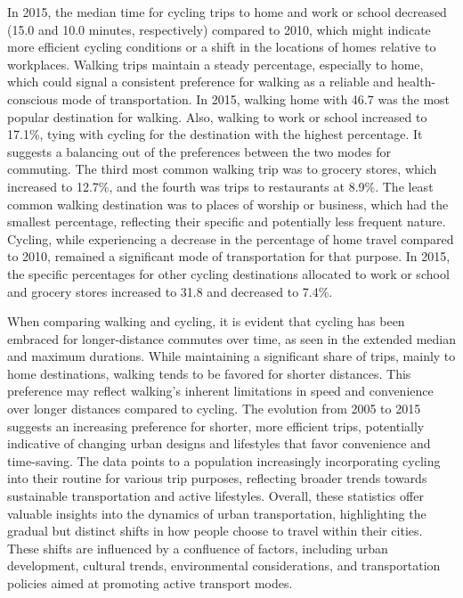 \documentclass[12pt,twoside]{reedthesis}
\begin{document}
In 2015, the median time for cycling trips to home and work or school decreased (15.0 and 10.0 minutes, respectively) compared to 2010, which might indicate more efficient cycling conditions or a shift in the locations of homes relative to workplaces. Walking trips maintain a steady percentage, especially to home, which could signal a consistent preference for walking as a reliable and health-conscious mode of transportation. In 2015, walking home with 46.7 was the most popular destination for walking. Also, walking to work or school increased to 17.1\%, tying with cycling for the destination with the highest percentage. It suggests a balancing out of the preferences between the two modes for commuting. The third most common walking trip was to grocery stores, which increased to 12.7\%, and the fourth was trips to restaurants at 8.9\%. The least common walking destination was to places of worship or business, which had the smallest percentage, reflecting their specific and potentially less frequent nature.
Cycling, while experiencing a decrease in the percentage of home travel compared to 2010, remained a significant mode of transportation for that purpose. In 2015, the specific percentages for other cycling destinations allocated to work or school and grocery stores increased to 31.8 and decreased to 7.4\%.

When comparing walking and cycling, it is evident that cycling has been embraced for longer-distance commutes over time, as seen in the extended median and maximum durations. While maintaining a significant share of trips, mainly to home destinations, walking tends to be favored for shorter distances. This preference may reflect walking's inherent limitations in speed and convenience over longer distances compared to cycling.
The evolution from 2005 to 2015 suggests an increasing preference for shorter, more efficient trips, potentially indicative of changing urban designs and lifestyles that favor convenience and time-saving. The data points to a population increasingly incorporating cycling into their routine for various trip purposes, reflecting broader trends towards sustainable transportation and active lifestyles. Overall, these statistics offer valuable insights into the dynamics of urban transportation, highlighting the gradual but distinct shifts in how people choose to travel within their cities. These shifts are influenced by a confluence of factors, including urban development, cultural trends, environmental considerations, and transportation policies aimed at promoting active transport modes.
\end{document}
